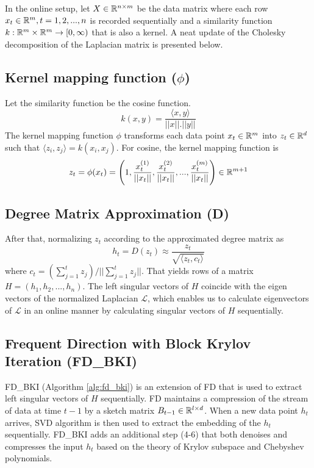 In the online setup, let $X \in \mathbb{R}^{n \times m}$ be the data matrix where each row $x_t \in \mathbb{R}^{m}, t=1, 2, ..., n$ is recorded sequentially and a similarity function $k: \mathbb{R}^m \times \mathbb{R}^m \to [0, \infty)$ that is also a kernel. A neat update of the Cholesky decomposition of the Laplacian matrix is presented below.

\subsection{Kernel mapping function ($\phi$)}

Let the similarity function be the cosine function. 
$$
    k(x, y) = \frac{\langle x, y\rangle}{||x||.||y||}
$$
The kernel mapping function $\phi$ transforms each data point $x_t \in \mathbb{R}^m$ into $z_t \in \mathbb{R}^d$ such that $\langle z_i, z_j \rangle = k(x_i, x_j)$. For cosine, the kernel mapping function is
$$
    z_t = \phi(x_t) = \left(1, \frac{x_t^{(1)}}{||x_t||}, \frac{x_t^{(2)}}{||x_t||}, ..., \frac{x_t^{(m)}}{||x_t||}\right) \in \mathbb{R}^{m+1}
$$

\subsection{Degree Matrix Approximation (D)}

After that, normalizing $z_t$ according to the approximated degree matrix as 
$$
    h_t = D(z_t) \approx \frac{z_t}{\sqrt{\langle z_t, c_t \rangle}}
$$
where $c_t = (\sum_{j=1}^t z_j) / ||\sum_{j=1}^t z_j||$. That yields  rows of a matrix $H = (h_1, h_2, ..., h_n)$. The left singular vectors of $H$ coincide with the eigen vectors of the normalized Laplacian $\mathcal{L}$, which enables us to calculate eigenvectors of $\mathcal{L}$ in an online manner by calculating singular vectors of $H$ sequentially.

\subsection{Frequent Direction with Block Krylov Iteration (FD\_BKI)}

FD\_BKI (Algorithm \ref{alg:fd_bki}) is an extension of FD that is used to extract left singular vectors of $H$ sequentially. FD maintains a compression of the stream of data at time $t-1$ by a sketch matrix $B_{t-1} \in \mathbb{R}^{l \times d}$. When a new data point $h_t$ arrives, SVD algorithm is then used to extract the embedding of the $h_t$ sequentially. FD\_BKI adds an additional step (4-6) that both denoises and compresses the input $h_t$ based on the theory of Krylov subspace and Chebyshev polynomials.

